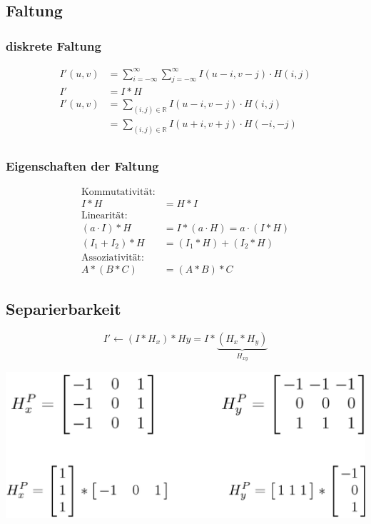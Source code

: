 \documentclass[10pt]{article}
\newcommand{\RN}{\mathbb{R}} %
\begin{document}
\subsection{Faltung}
\subsubsection{diskrete Faltung}
\begin{align*}
	I'(u,v) &= \sum_{i=-\infty}^\infty \sum_{j=-\infty}^\infty I(u-i,v-j) \cdot H(i,j) \\
	I' &= I*H \\
	I'(u,v) &= \sum_{(i,j) \in \RN} I(u-i,v-j) \cdot H(i,j) \\
	 &= \sum_{(i,j) \in \RN} I(u+i,v+j) \cdot H(-i,-j) \\
\end{align*}
\subsubsection{Eigenschaften der Faltung}
\begin{align*}
 \text{Kommutativität:} \\
	I*H &= H * I \\
	\text{Linearität:} \\
	(a \cdot I) * H &= I * (a \cdot H) = a \cdot (I*H) \\
	(I_1 + I_2) * H &= (I_1 * H) + (I_2 * H) \\
	\text{Assoziativität:} \\
	A * (B * C) &= (A * B ) * C
\end{align*}

\subsection{Separierbarkeit}
\begin{equation*}
	I' \leftarrow (I*H_x)*Hy = I * \underbrace{(H_x*H_y)}_{H_{xy}}
\end{equation*}
\begin{center}
	\includegraphics[scale=0.2]{separierbarkeit.png}
\end{center}
\end{document}
